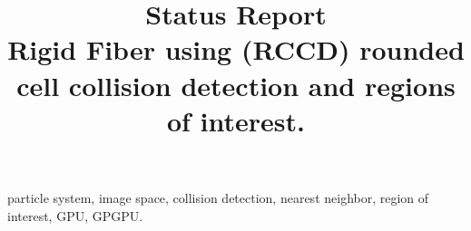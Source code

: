 \documentclass[10pt,conference]{IEEEtran}
\begin{document}
%
\title{Status Report \\ Rigid Fiber using (RCCD) rounded cell collision detection and regions of interest.}


\author{


}
\maketitle

\pagestyle{plain}
\begin{abstract}
  
\end{abstract}

\begin{IEEEkeywords}
particle system, image space, collision detection, nearest neighbor, region of interest, GPU, GPGPU.
\end{IEEEkeywords}


%


%
%
\end{document}
